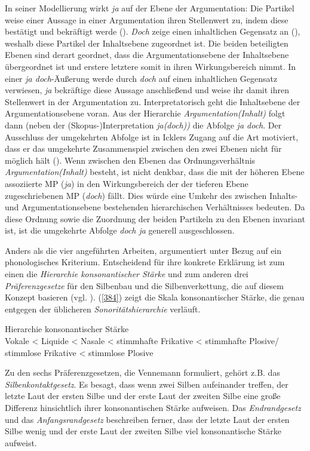 In seiner Modellierung wirkt \textit{ja} auf der Ebene der Argumentation: Die Partikel weise einer Aussage in einer Argumentation ihren Stellenwert zu, indem diese bestätigt und bekräftigt werde (\citeyear[399]{Ickler1994}). \textit{Doch} zeige einen inhaltlichen Gegensatz an (\citeyear[401]{Ickler1994}), weshalb diese Partikel der Inhaltsebene zugeordnet ist. Die beiden beteiligten Ebenen sind derart geordnet, dass die Argumentationsebene  der Inhaltsebene  übergeordnet ist und erstere letztere somit in ihren Wirkungsbereich nimmt. In einer \textit{ja doch}-Äußerung werde durch \textit{doch} auf einen inhaltlichen Gegensatz verwiesen, \textit{ja} bekräftige diese Aussage anschließend und weise ihr damit ihren Stellenwert in der Argumentation zu. Interpretatorisch geht die Inhaltsebene der Argumentationsebene voran. Aus der Hierarchie \textit{Argumentation(Inhalt)} folgt dann (neben der (Skopus-)Interpretation \textit{ja(doch))} die Abfolge \textit{ja doch}. Der Ausschluss der umgekehrten Abfolge ist in Icklers Zugang auf die Art motiviert, dass er das umgekehrte Zusammenspiel zwischen den zwei Ebenen nicht für möglich hält (\citeyear[404]{Ickler1994}). Wenn zwischen den Ebenen das Ordnungsverhältnis \textit{Argumentation(Inhalt)} besteht, ist nicht denkbar, dass die mit der höheren Ebene assoziierte MP (\textit{ja}) in den Wirkungsbereich der der tieferen Ebene zugeschriebenen MP (\textit{doch}) fällt. Dies würde eine Umkehr des zwischen Inhalts- und Argumentationsebene bestehenden hierarchischen Verhältnisses bedeuten. Da diese Ordnung sowie die Zuordnung der beiden Partikeln zu den Ebenen invariant ist, ist die umgekehrte Abfolge \textit{doch ja} generell ausgeschlossen.

Anders als die vier angeführten Arbeiten, argumentiert \citet{Lindner1991} unter Bezug auf ein phonologisches Kriterium. Entscheidend für ihre konkrete Er\-klärung ist zum einen die \textit{Hierarchie konsonantischer Stärke}  und zum anderen drei \textit{Präferenzgesetze}  für den Silbenbau und die Silbenverkettung, die auf diesem Konzept basieren (vgl. \citealt[283/284]{Vennemann1982}). (\ref{384}) zeigt die Skala konsonantischer Stärke, die genau entgegen der üblicheren \textit{Sonoritätshierarchie}  verläuft.

\begin{exe}
	\ex\label{384} 
	Hierarchie konsonantischer Stärke\\
	Vokale < Liquide < Nasale < stimmhafte Frikative < stimmhafte Plosive/\\stimmlose Frikative < stimmlose Plosive
\end{exe}
Zu den sechs Präferenzgesetzen, die Vennemann formuliert, gehört z.B.  das \textit{Silbenkontaktgesetz}. Es besagt, dass wenn zwei Silben aufeinander treffen, der letzte Laut der ersten Silbe und der erste Laut der zweiten Silbe eine große Differenz hinsichtlich ihrer konsonantischen Stärke aufweisen. Das \textit{Endrandgesetz}  und das \textit{Anfangsrandgesetz}  beschreiben ferner, dass der letzte Laut der ersten Silbe wenig und der erste Laut der zweiten Silbe viel konsonantische Stärke aufweist.

